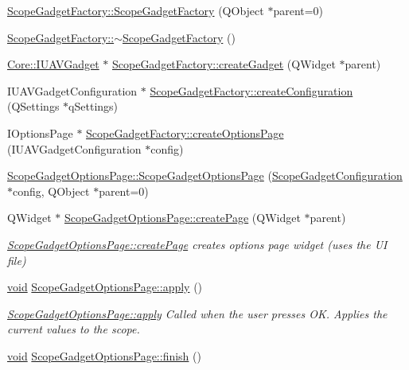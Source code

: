 \begin{DoxyCompactItemize}
\hyperlink{group___scope_plugin_gace4d87876bb88a527c473e6f363a4a60}{\-Scope\-Gadget\-Factory\-::\-Scope\-Gadget\-Factory} (\-Q\-Object $\ast$parent=0)
\item 
\hyperlink{group___scope_plugin_gae7d925002f23646412ea50bf0a6c1658}{\-Scope\-Gadget\-Factory\-::$\sim$\-Scope\-Gadget\-Factory} ()
\item 
\hyperlink{class_core_1_1_i_u_a_v_gadget}{\-Core\-::\-I\-U\-A\-V\-Gadget} $\ast$ \hyperlink{group___scope_plugin_ga38da87ae88b0f1bd3ae63e997528ed56}{\-Scope\-Gadget\-Factory\-::create\-Gadget} (\-Q\-Widget $\ast$parent)
\item 
\-I\-U\-A\-V\-Gadget\-Configuration $\ast$ \hyperlink{group___scope_plugin_gacbb08116cc0c7390601e30b6cfde0cba}{\-Scope\-Gadget\-Factory\-::create\-Configuration} (\-Q\-Settings $\ast$q\-Settings)
\item 
\-I\-Options\-Page $\ast$ \hyperlink{group___scope_plugin_ga121b0d9857a168a0ad41f980d5c34b63}{\-Scope\-Gadget\-Factory\-::create\-Options\-Page} (\-I\-U\-A\-V\-Gadget\-Configuration $\ast$config)
\item 
\hyperlink{group___scope_plugin_ga3680539fc8bb7716884d7e3da9caff3a}{\-Scope\-Gadget\-Options\-Page\-::\-Scope\-Gadget\-Options\-Page} (\hyperlink{class_scope_gadget_configuration}{\-Scope\-Gadget\-Configuration} $\ast$config, \-Q\-Object $\ast$parent=0)
\item 
\-Q\-Widget $\ast$ \hyperlink{group___scope_plugin_ga4032bc264c49c13a4bf81d5835a33206}{\-Scope\-Gadget\-Options\-Page\-::create\-Page} (\-Q\-Widget $\ast$parent)
\begin{DoxyCompactList}\small\item\em \hyperlink{group___scope_plugin_ga4032bc264c49c13a4bf81d5835a33206}{\-Scope\-Gadget\-Options\-Page\-::create\-Page} creates options page widget (uses the \-U\-I file) \end{DoxyCompactList}\item 
\hyperlink{group___u_a_v_objects_plugin_ga444cf2ff3f0ecbe028adce838d373f5c}{void} \hyperlink{group___scope_plugin_gaf046ff419274a440bbca457fd018c3e1}{\-Scope\-Gadget\-Options\-Page\-::apply} ()
\begin{DoxyCompactList}\small\item\em \hyperlink{group___scope_plugin_gaf046ff419274a440bbca457fd018c3e1}{\-Scope\-Gadget\-Options\-Page\-::apply} \-Called when the user presses \-O\-K. \-Applies the current values to the scope. \end{DoxyCompactList}\item 
\hyperlink{group___u_a_v_objects_plugin_ga444cf2ff3f0ecbe028adce838d373f5c}{void} \hyperlink{group___scope_plugin_ga106935101fc319a034138e2c37c02f8c}{\-Scope\-Gadget\-Options\-Page\-::finish} ()

\end{DoxyCompactItemize}

